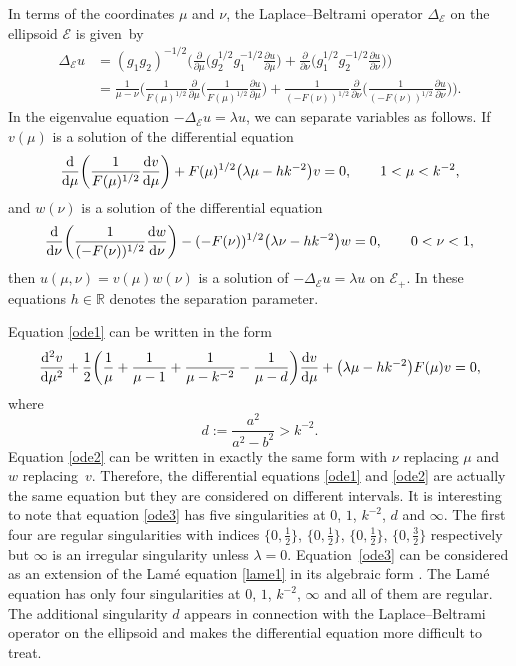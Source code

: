 \documentclass[pdftex]{sigma}
\newcommand{\R}{\mathbb{R}}
\newcommand{\E}{\mathcal{E}}
\newcommand{\D}{\Delta_\E}
\numberwithin{equation}{section}
\begin{document}
In terms of the coordinates $\mu$ and $\nu$, the Laplace--Beltrami operator $\D$ on the ellipsoid $\E$ is given~by
\begin{align*}
 \D u&{}=(g_1g_2)^{-1/2}\biggl(\frac{\partial}{\partial \mu}\biggl(g_2^{1/2}g_1^{-1/2}
\frac{\partial u}{\partial \mu}\biggr)+\frac{\partial}{\partial \nu}\biggl(g_1^{1/2}g_2^{-1/2}
\frac{\partial u}{\partial \nu}\biggr) \biggr)\\
&{}=\frac1{\mu-\nu}\biggl(\frac{1}{F(\mu)^{1/2}}\frac{\partial}{\partial \mu}\biggl(\frac{1}{F(\mu)^{1/2}}\frac{\partial u}{\partial \mu}
\biggr)
+\frac{1}{(-F(\nu))^{1/2}}\frac{\partial}{\partial \nu}\biggl(\frac{1}{(-F(\nu))^{1/2}}\frac{\partial u}{\partial \nu}\biggr)\biggr).
\end{align*}
In the eigenvalue equation $-\D u=\lambda u$, we can separate variables as follows.
If $v(\mu)$ is a solution of the differential equation
\begin{equation}\label{ode1}
\frac{{\rm d}}{{\rm d}\mu}\biggl(\frac{1}{F(\mu)^{1/2}}\frac{{\rm d}v}{{\rm d}\mu}\biggr)+F(\mu)^{1/2}\bigl(\lambda\mu-hk^{-2}\bigr)v =0,\qquad 1<\mu<k^{-2},
\end{equation}
and $w(\nu)$ is a solution of the differential equation
\begin{equation}\label{ode2}
\frac{{\rm d}}{{\rm d}\nu}\biggl(\frac{1}{(-F(\nu))^{1/2}}\frac{{\rm d}w}{{\rm d}\nu}\biggr)-(-F(\nu))^{1/2}\bigl(\lambda \nu-hk^{-2}\bigr) w =0,\qquad 0<\nu<1,
\end{equation}
then $u(\mu,\nu)=v(\mu)w(\nu)$ is a solution of $-\D u=\lambda u$ on $\E_+$. In these equations $h\in\R$ denotes the separation parameter.

Equation \eqref{ode1} can be written in the form
\begin{equation}\label{ode3}
\frac{{\rm d}^2v}{{\rm d}\mu^2}+\frac12\biggl(\frac1\mu+\frac1{\mu-1}+\frac1{\mu-k^{-2}}-\frac1{\mu-d}\biggr)
\frac{{\rm d}v}{{\rm d}\mu}+\bigl(\lambda \mu-hk^{-2}\bigr)F(\mu) v=0,
\end{equation}
where
\[ d:=\frac{a^2}{a^2-b^2}>k^{-2}.\]
Equation \eqref{ode2} can be written in exactly the same form with $\nu$ replacing $\mu$ and $w$ replacing~$v$.
Therefore, the differential equations \eqref{ode1} and \eqref{ode2} are actually the same equation but they are considered on different intervals.
It is interesting to note that equation \eqref{ode3} has five singularities at $0$, $1$, $k^{-2}$, $d$ and $\infty$.
The first four are regular singularities \cite[Sections~5 and~4]{O} with indices $\{0,\frac12\}$, $\{0,\frac12\}$, $\{0,\frac12\}$, $\{0,\frac32\}$
respectively but $\infty$ is an irregular singularity unless $\lambda=0$. Equation~\eqref{ode3} can be considered as an extension of
the Lam\'e equation \eqref{lame1} in its algebraic form \cite[Section~29.2.2]{dlmf}. The Lam\'e equation has only four singularities at $0$, $1$, $k^{-2}$, $\infty$ and all of them are regular. The additional singularity $d$ appears in connection with the Laplace--Beltrami operator on the ellipsoid and makes the differential equation more difficult to treat.
\end{document}
